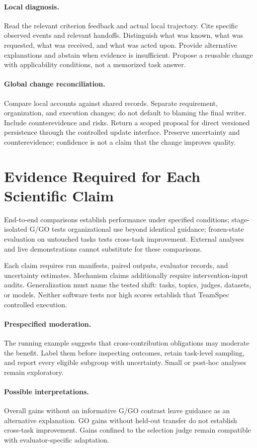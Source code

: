 \paragraph{Local diagnosis.}
Read the relevant criterion feedback and actual local trajectory. Cite specific observed events and relevant handoffs. Distinguish what was known, what was requested, what was received, and what was acted upon. Provide alternative explanations and abstain when evidence is insufficient. Propose a reusable change with applicability conditions, not a memorized task answer.

\paragraph{Global change reconciliation.}
Compare local accounts against shared records. Separate requirement, organization, and execution changes; do not default to blaming the final writer. Include counterevidence and risks. Return a scoped proposal for direct versioned persistence through the controlled update interface. Preserve uncertainty and counterevidence; confidence is not a claim that the change improves quality.


\section{Evidence Required for Each Scientific Claim}
\label{app:claims}

End-to-end comparisons establish performance under specified conditions; stage-isolated G/GO tests organizational use beyond identical guidance; frozen-state evaluation on untouched tasks tests cross-task improvement. External analyses and live demonstrations cannot substitute for these comparisons.

Each claim requires run manifests, paired outputs, evaluator records, and uncertainty estimates. Mechanism claims additionally require intervention-input audits. Generalization must name the tested shift: tasks, topics, judges, datasets, or models. Neither software tests nor high scores establish that TeamSpec controlled execution.

\paragraph{Prespecified moderation.}
The running example suggests that cross-contribution obligations may moderate the benefit. Label them before inspecting outcomes, retain task-level sampling, and report every eligible subgroup with uncertainty. Small or post-hoc analyses remain exploratory.

\paragraph{Possible interpretations.}
Overall gains without an informative G/GO contrast leave guidance as an alternative explanation. GO gains without held-out transfer do not establish cross-task improvement. Gains confined to the selection judge remain compatible with evaluator-specific adaptation.
